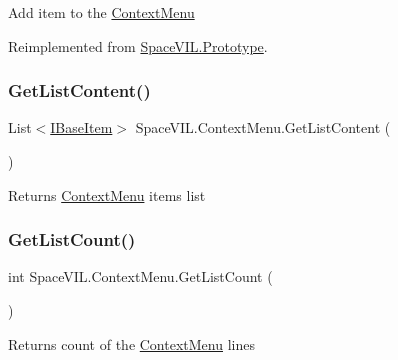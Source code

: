 Add item to the \mbox{\hyperlink{class_space_v_i_l_1_1_context_menu}{Context\+Menu}} 



Reimplemented from \mbox{\hyperlink{class_space_v_i_l_1_1_prototype}{Space\+V\+I\+L.\+Prototype}}.

\mbox{\label{class_space_v_i_l_1_1_context_menu_a9cc6b338e39d87a707c2a873f089de0d}} 
\subsubsection{\texorpdfstring{Get\+List\+Content()}{GetListContent()}}
{\footnotesize\ttfamily List$<$\mbox{\hyperlink{interface_space_v_i_l_1_1_core_1_1_i_base_item}{I\+Base\+Item}}$>$ Space\+V\+I\+L.\+Context\+Menu.\+Get\+List\+Content (\begin{DoxyParamCaption}{ }\end{DoxyParamCaption})}



Returns \mbox{\hyperlink{class_space_v_i_l_1_1_context_menu}{Context\+Menu}} items list 

\mbox{\label{class_space_v_i_l_1_1_context_menu_af0c5909f660fd0db8b458849f0a3d182}} 
\subsubsection{\texorpdfstring{Get\+List\+Count()}{GetListCount()}}
{\footnotesize\ttfamily int Space\+V\+I\+L.\+Context\+Menu.\+Get\+List\+Count (\begin{DoxyParamCaption}{ }\end{DoxyParamCaption})}



Returns count of the \mbox{\hyperlink{class_space_v_i_l_1_1_context_menu}{Context\+Menu}} lines 

\mbox{\label{class_space_v_i_l_1_1_context_menu_afad2d14b827ab4b008f2beeaefd2aca7}} 
